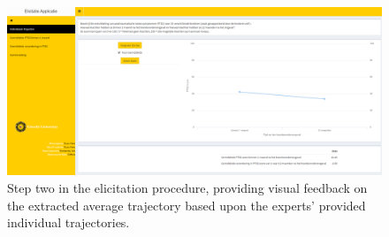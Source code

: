 \documentclass[openright,titlepage,12pt,a4paper]{book}
\begin{document}
\vspace*{2cm}

\begin{figure}

{\centering \includegraphics[width=0.9\linewidth]{figures/chapter_6/Figure3} 

}

\caption{Step two in the elicitation procedure, providing visual feedback on the extracted average trajectory based upon the experts' provided individual trajectories.}\label{fig:ch06fig3}
\end{figure}

\newpage
\end{document}
